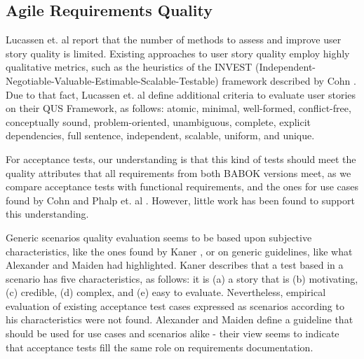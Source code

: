 \subsection{\label{chap:chap2_agile_quality}Agile Requirements Quality}

Lucassen et. al \cite{Lucassen_et_dot_al_2015} report that the number of methods to assess and improve user story quality is limited. Existing approaches to user story quality employ highly qualitative metrics, such as the heuristics of the INVEST (Independent-Negotiable-Valuable-Estimable-Scalable-Testable) framework described by Cohn \cite{Cohn_2004}. Due to that fact, Lucassen et. al \cite{Lucassen_et_dot_al_2015} define additional criteria to evaluate user stories on their QUS Framework, as follows: atomic, minimal, well-formed, conflict-free, conceptually sound, problem-oriented, unambiguous, complete, explicit dependencies, full sentence, independent, scalable, uniform, and unique.

For acceptance tests, our understanding is that this kind of tests should meet the quality attributes that all requirements from both BABOK versions \cite{Babok_2009}\cite{Babok_2015} meet, as we compare acceptance tests with functional requirements, and the ones for use cases found by Cohn \cite{Cockburn_2000} and Phalp et. al \cite{Phalp_et_dot_al_2011}. However, little work has been found to support this understanding. 

Generic scenarios quality evaluation seems to be based upon subjective characteristics, like the ones found by Kaner \cite{Kaner_2003}, or on generic guidelines, like what Alexander and Maiden \cite{Alexander_and_Maiden_2004} had highlighted. Kaner \cite{Kaner_2003} describes that a test based in a scenario has five characteristics, as follows: it is (a) a story that is (b) motivating, (c) credible, (d) complex, and (e) easy to evaluate. Nevertheless, empirical evaluation of existing acceptance test cases expressed as scenarios according to his characteristics were not found. Alexander and Maiden \cite{Alexander_and_Maiden_2004} define a guideline that should be used for use cases and scenarios alike - their view seems to indicate that acceptance tests fill the same role on requirements documentation.  

